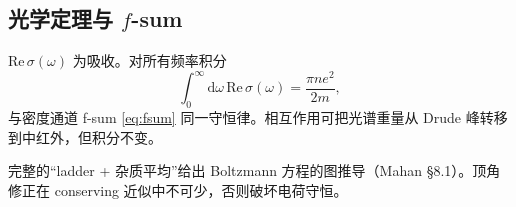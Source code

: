\subsection{光学定理与 \texorpdfstring{$f$}{f}-sum}

$\mathrm{Re}\,\sigma(\omega)$ 为吸收。对所有频率积分
\begin{equation}
  \int_0^{\infty}\mathrm{d}\omega\,
  \mathrm{Re}\,\sigma(\omega)
  =\frac{\pi n e^2}{2m},
\end{equation}
与密度通道 f-sum \eqref{eq:fsum} 同一守恒律。相互作用可把光谱重量从 Drude 峰转移到中红外，但积分不变。

\begin{note}
完整的“ladder + 杂质平均”给出 Boltzmann 方程的图推导（Mahan §8.1）。顶角修正在 conserving 近似中不可少，否则破坏电荷守恒。
\end{note}
